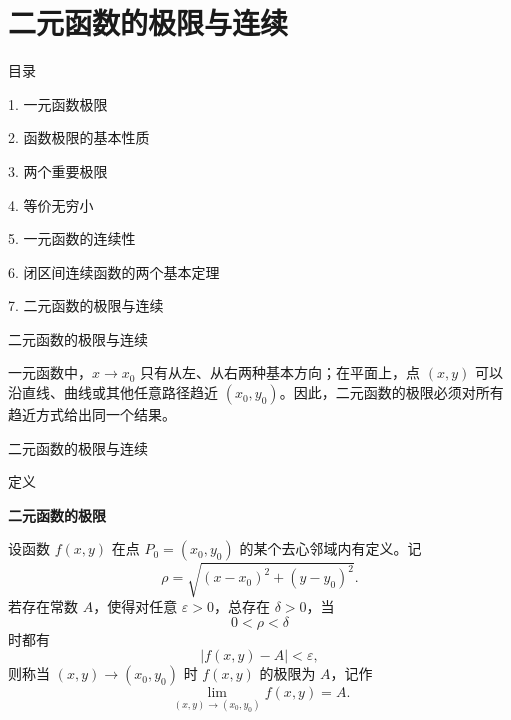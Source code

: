 \documentclass[aspectratio=169,10pt,fontset=fandol]{ctexbeamer}
\begin{document}
\section{二元函数的极限与连续}
\begin{frame}[t,fragile]{目录}
\normalsize
{\color{black}\normalsize 1. 一元函数极限\par}\vspace{0.22em}
{\color{black}\normalsize 2. 函数极限的基本性质\par}\vspace{0.22em}
{\color{black}\normalsize 3. 两个重要极限\par}\vspace{0.22em}
{\color{black}\normalsize 4. 等价无穷小\par}\vspace{0.22em}
{\color{black}\normalsize 5. 一元函数的连续性\par}\vspace{0.22em}
{\color{black}\normalsize 6. 闭区间连续函数的两个基本定理\par}\vspace{0.22em}
{\color{blue}\normalsize 7. 二元函数的极限与连续\par}\vspace{0.22em}
\end{frame}
\begin{frame}[t,fragile]{二元函数的极限与连续}
\normalsize
{\normalsize
一元函数中，\(x\to x_0\) 只有从左、从右两种基本方向；在平面上，点 \((x,y)\) 可以沿直线、曲线或其他任意路径趋近 \((x_0,y_0)\)。因此，二元函数的极限必须对所有趋近方式给出同一个结果。


}
\end{frame}
\begin{frame}[t,fragile]{二元函数的极限与连续}
\footnotesize
\begin{block}{定义}
{\footnotesize
\textbf{二元函数的极限}\par

	设函数 \(f(x,y)\) 在点 \(P_0=(x_0,y_0)\) 的某个去心邻域内有定义。记
	\[
	\rho=\sqrt{(x-x_0)^2+(y-y_0)^2}.
	\]
	若存在常数 \(A\)，使得对任意 \(\varepsilon>0\)，总存在 \(\delta>0\)，当
	\[
	0<\rho<\delta
	\]
	时都有
	\[
	|f(x,y)-A|<\varepsilon,
	\]
	则称当 \((x,y)\to(x_0,y_0)\) 时 \(f(x,y)\) 的极限为 \(A\)，记作
	\[
	\lim_{(x,y)\to(x_0,y_0)}f(x,y)=A.
	\]

}
\end{block}
\end{frame}
\end{document}
